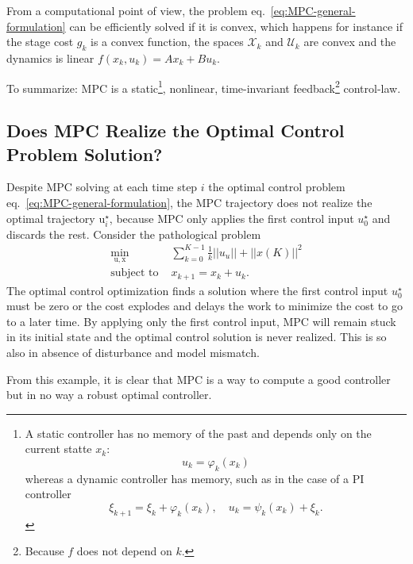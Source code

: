 \documentclass[11pt]{report}
\newcommand{\bs}[1]{\boldsymbol{#1}}
\newcommand{\bsu}{\bs{\mathrm{u}}}
\newcommand{\bsx}{\bs{\mathrm{x}}}
\begin{document}
From a computational point of view, the problem eq.~\eqref{eq:MPC-general-formulation} can be efficiently solved if it is convex, which happens for instance if the stage cost $g_k$ is a convex function, the spaces $\mathcal{X}_k$ and $\mathcal{U}_k$ are convex and the dynamics is linear $f(x_k,u_k)=Ax_k+Bu_k$.


To summarize: MPC is a static\footnote{A static controller has no memory of the past and depends only on the current statte $x_k$:
  \begin{equation*}
    u_k = \varphi_k(x_k)
  \end{equation*}
  whereas a dynamic controller has memory, such as in the case of a
  PI controller
  \begin{equation*}
    \xi_{k+1} = \xi_k + \varphi_k(x_k),\quad u_k = \psi_k(x_k) + \xi_k.
  \end{equation*}}, nonlinear, time-invariant feedback\footnote{Because $f$ does not depend on $k$.} control-law.


\subsection{Does MPC Realize the Optimal Control Problem Solution?}
\label{sec:MPC-not-an-optimal-control-solver}

Despite MPC solving at each time step $i$ the optimal control problem eq.~\eqref{eq:MPC-general-formulation}, the MPC trajectory does not realize the optimal trajectory $\bsu_i^\star$, because MPC only applies the first control input $u_0^\star$ and discards the rest. Consider the pathological problem
\begin{align*}
  \min_{\bsu,\bsx} & \sum_{k=0}^{K-1}\frac {1}{k}||u_u|| + ||x(K)||^2\\
  \text{subject to } &x_{k+1} = x_k+u_k.
\end{align*}
The optimal control optimization finds a solution where the first control input $u_0^\star$ must be zero or the cost explodes and delays the work to minimize the cost to go to a later time. By applying only the first control input, MPC will remain stuck in its initial state and the optimal control solution is never realized. This is so also in absence of disturbance and model mismatch.

From this example, it is clear that MPC is a way to compute a good controller but in no way a robust optimal controller.
\end{document}

